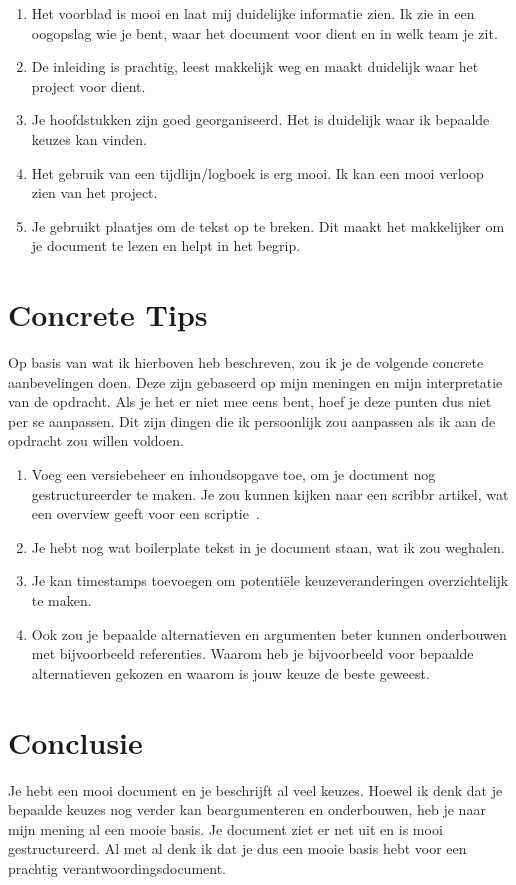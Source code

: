 \documentclass[a4paper]{report}
\begin{document}
\begin{enumerate}
  \item Het voorblad is mooi en laat mij duidelijke informatie zien. Ik zie in een oogopslag wie je bent, waar het document voor dient en in welk team je zit.
  \item De inleiding is prachtig, leest makkelijk weg en maakt duidelijk waar het project voor dient. 
  \item Je hoofdstukken zijn goed georganiseerd. Het is duidelijk waar ik bepaalde keuzes kan vinden. 
  \item Het gebruik van een tijdlijn/logboek is erg mooi. Ik kan een mooi verloop zien van het project.
  \item Je gebruikt plaatjes om de tekst op te breken. Dit maakt het makkelijker om je document te lezen en helpt in het begrip.
\end{enumerate}

\section{Concrete Tips}
Op basis van wat ik hierboven heb beschreven, zou ik je de volgende concrete aanbevelingen doen. 
Deze zijn gebaseerd op mijn meningen en mijn interpretatie van de opdracht. 
Als je het er niet mee eens bent, hoef je deze punten dus niet per se aanpassen.
Dit zijn dingen die ik persoonlijk zou aanpassen als ik aan de opdracht zou willen voldoen.

\begin{enumerate}
  \item Voeg een versiebeheer en inhoudsopgave toe, om je document nog gestructureerder te maken. Je zou kunnen kijken naar een scribbr artikel, wat een overview geeft voor een scriptie~\cite{scribbrThesis}.
  \item Je hebt nog wat boilerplate tekst in je document staan, wat ik zou weghalen.
  \item Je kan timestamps toevoegen om potentiële keuzeveranderingen overzichtelijk te maken.
  \item Ook zou je bepaalde alternatieven en argumenten beter kunnen onderbouwen met bijvoorbeeld referenties. Waarom heb je bijvoorbeeld voor bepaalde alternatieven gekozen en waarom is jouw keuze de beste geweest.
\end{enumerate}

\section{Conclusie}
Je hebt een mooi document en je beschrijft al veel keuzes. 
Hoewel ik denk dat je bepaalde keuzes nog verder kan beargumenteren en onderbouwen, heb je naar mijn mening al een mooie basis. 
Je document ziet er net uit en is mooi gestructureerd. Al met al denk ik dat je dus een mooie basis hebt voor een prachtig verantwoordingsdocument.
\end{document}
